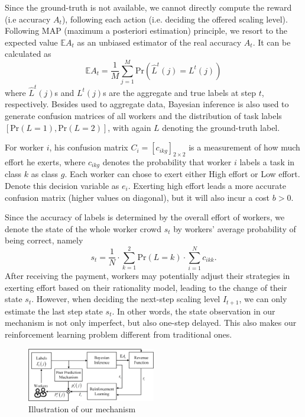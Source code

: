\documentclass[letterpaper]{article} %
\begin{document}
Since the ground-truth is not available, we cannot directly compute the reward (i.e accuracy $A_t$), following each action (i.e. deciding the offered scaling level).
Following MAP (maximum a posteriori estimation) principle, we resort to the expected value $\mathbb{E}A_t$ as an unbiased estimator of the real accuracy $A_t$.
It can be calculated as
\begin{equation}
\mathbb{E}A_t = \frac{1}{M}{\sum}_{j=1}^{M} \textrm{Pr}(\hat{L}^{t}(j) = L^{t}(j))
\end{equation}
where $\hat{L}^{t}(j)$s and $L^{t}(j)$s are the aggregate and true labels at step $t$, respectively. Besides used to aggregate data, Bayesian inference is also used to generate confusion matrices of all workers and the distribution of task labels $\left[\textrm{Pr}(L =1), \textrm{Pr}(L=2)\right]$, with again $L$ denoting the ground-truth label.


For worker $i$, his confusion matrix $C_i = [c_{ikg}]_{2\times 2}$ is a measurement of how much effort he exerts, where $c_{ikg}$ denotes the probability that worker $i$ labels a task in class $k$ as class $g$. Each worker can chose to exert either High effort or Low effort. Denote this decision variable as $e_i$. Exerting high effort leads a more accurate confusion matrix (higher values on diagonal), but it will also incur a cost $b>0$. 

Since the accuracy of labels is determined by the overall effort of workers, we denote the state of the whole worker crowd $s_t$ by workers' average probability of being correct, namely
\begin{equation}
s_t =\frac{1}{N}\cdot {\sum}_{k=1}^2\textrm{Pr}(L=k)\cdot  {\sum}_{i=1}^{N}c_{ikk}.
\end{equation}
After receiving the payment, workers may potentially adjust their strategies in exerting effort based on their rationality model, leading to the change of their state $s_t$.
However, when deciding the next-step scaling level $I_{t+1}$, we can only estimate the last step state $s_t$.
In other words, the state observation in our mechanism is not only imperfect, but also one-step delayed. This also makes our reinforcement learning problem different from traditional ones.
\begin{figure}[!htb]
        \includegraphics[width=0.5\textwidth]{image/Mechanism}
        \caption{\label{ED1} Illustration of our mechanism}
\end{figure}
\end{document}
